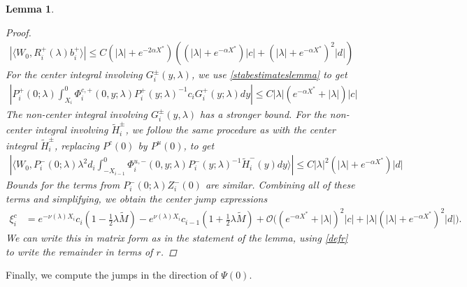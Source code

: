 \documentclass[10pt,reqno]{amsart}
\theoremstyle{plain}
\newtheorem{lemma}[theorem]{Lemma}
\theoremstyle{definition}
\theoremstyle{remark}
\numberwithin{theorem}{section}
\numberwithin{equation}{section}
\begin{document}
\begin{lemma}
\begin{proof}
\begin{align*}
|\langle W_0, R_i^+(\lambda) b_i^+ \rangle |\leq C \left(|\lambda| + e^{-2 \alpha X^*}\right)\left((|\lambda|+e^{-\alpha X^*})|c| + (|\lambda| + e^{-\alpha X^*})^2 |d| \right)
\end{align*}
For the center integral involving $G_i^\pm(y, \lambda)$, we use \cref{stabestimateslemma} to get
\begin{align*}
\left| P_i^+(0; \lambda) \int_{X_i}^0 \Phi_i^{c,+}(0, y; \lambda) P_i^+(y; \lambda)^{-1} c_i G_i^+(y; \lambda)  dy \right| \leq C |\lambda| (e^{-\alpha X^*} + |\lambda|) |c|
\end{align*}
The non-center integral involving $G_i^\pm(y, \lambda)$ has a stronger bound. For the non-center integral involving $\tilde{H}_i^\pm$, we follow the same procedure as with the center integral $\tilde{H}_i^\pm$, replacing $P^c(0)$ by $P^u(0)$, to get
\begin{align*}
\left|  \langle W_0, P_i^-(0; \lambda) \lambda^2 d_i \int_{-X_{i-1}}^0 \Phi_i^{u,-}(0, y; \lambda) P_i^-(y; \lambda)^{-1} \tilde{H}_i^-(y) dy \rangle \right| \leq C |\lambda|^2 (|\lambda| + e^{- \alpha X^*}) |d|
\end{align*}
Bounds for the terms from $P_i^-(0; \lambda) Z_i^-(0)$ are similar. Combining all of these terms and simplifying, we obtain the center jump expressions
\begin{align*}
\xi^c_i &= e^{-\nu(\lambda)X_i}c_i\left( 1 - \frac{1}{2}\lambda \tilde{M} \right) 
- e^{\nu(\lambda)X_i}c_{i-1}\left( 1 + \frac{1}{2}\lambda \tilde{M} \right) + \mathcal{O}\Big( (e^{-\alpha X^*} + |\lambda|)^2 |c| + |\lambda| (|\lambda| + e^{-\alpha X^*})^2 |d| \Big).
\end{align*}
We can write this in matrix form as in the statement of the lemma, using \cref{defr} to write the remainder in terms of $r$.
\end{proof}
\end{lemma}

Finally, we compute the jumps in the direction of $\Psi(0)$.
\end{document}
